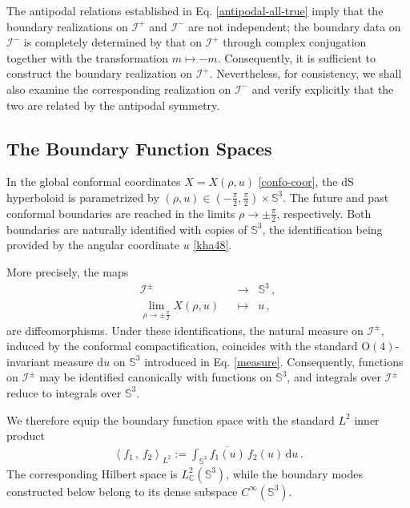 \documentclass[aps,twocolumn,nofootinbib]{revtex4}
\begin{document}
The antipodal relations established in Eq. \eqref{antipodal-all-true} imply that the boundary realizations on ${\mathcal{I}}^+$ and ${\mathcal{I}}^-$ are not independent; the boundary data on ${\mathcal{I}}^-$ is completely determined by that on ${\mathcal{I}}^+$ through complex conjugation together with the transformation $m\longmapsto -m$. Consequently, it is sufficient to construct the boundary realization on ${\mathcal{I}}^+$. Nevertheless, for consistency, we shall also examine the corresponding realization on ${\mathcal{I}}^-$ and verify explicitly that the two are related by the antipodal symmetry.


\subsection{The Boundary Function Spaces}

In the global conformal coordinates $X=X(\rho,u)$ \eqref{confo-coor}, the dS hyperboloid is parametrized by $(\rho,u)\in\left(-\frac{\pi}{2},\frac{\pi}{2}\right)\times{\mathbb{S}}^3$. The future and past conformal boundaries are reached in the limits $\rho\longrightarrow \pm\frac{\pi}{2}$, respectively. Both boundaries are naturally identified with copies of ${\mathbb{S}}^3$, the identification being provided by the angular coordinate $u$ \eqref{kha48}.

More precisely, the maps
\begin{align}\label{eq:I+-diffeo}
    {\mathcal{I}}^\pm &\;\;\longrightarrow\;\; {\mathbb{S}}^3 \,, \nonumber\\[3pt]
    \lim_{\rho\longrightarrow\pm\frac{\pi}{2}}X(\rho,u) &\;\;\longmapsto\;\; u \,,
\end{align}
are diffeomorphisms. Under these identifications, the natural measure on ${\mathcal{I}}^\pm$, induced by the conformal compactification, coincides with the standard $\mathrm O(4)$-invariant measure ${\mathrm{d}}u$ on ${\mathbb{S}}^3$ introduced in Eq. \eqref{measure}. Consequently, functions on ${{\mathcal{I}}}^{\pm}$ may be identified canonically with functions on ${\mathbb{S}}^3$, and integrals over ${{\mathcal{I}}}^{\pm}$ reduce to integrals over ${\mathbb{S}}^3$.

We therefore equip the boundary function space with the standard $L^2$ inner product
\begin{align}\label{eq:L2-inner}
    \left\langle f_1\,,\, f_2\right\rangle^{}_{L^2} := \int_{\mathbb{S}^3} \overline{f_1(u)}\,f_2(u)\,\mathrm{d}u\,.
\end{align}
The corresponding Hilbert space is $L^2_{\mathbb C}({\mathbb{S}}^3)$, while the boundary modes constructed below belong to its dense subspace $C^\infty({\mathbb{S}}^3)$.
\end{document}
